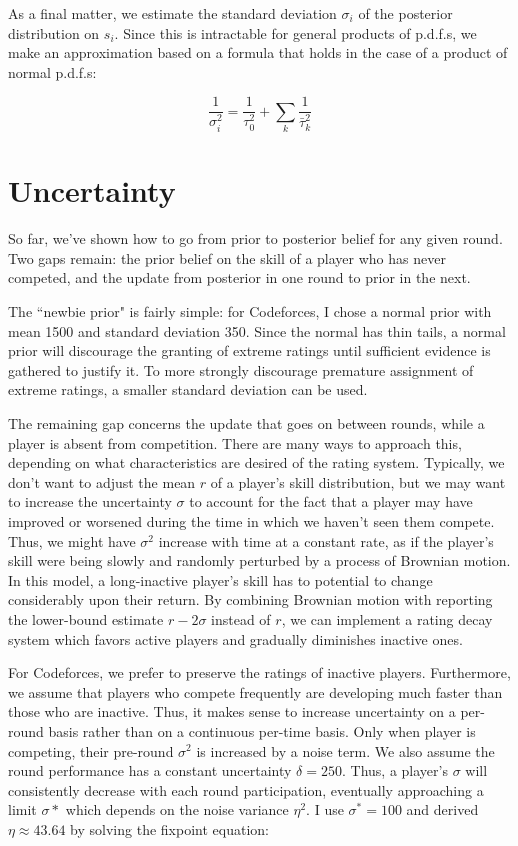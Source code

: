 \documentclass{article}
\begin{document}
As a final matter, we estimate the standard deviation $\sigma_i$ of the posterior distribution on $s_i$. Since this is intractable for general products of p.d.f.s, we make an approximation based on a formula that holds in the case of a product of normal p.d.f.s:

\[\frac{1}{\sigma_i^2} = \frac{1}{\tau_0^2} + \sum_k \frac{1}{\bar\tau_k^2}\]

\section{Uncertainty}

So far, we've shown how to go from prior to posterior belief for any given round. Two gaps remain: the prior belief on the skill of a player who has never competed, and the update from posterior in one round to prior in the next.

The ``newbie prior" is fairly simple: for Codeforces, I chose a normal prior with mean 1500 and standard deviation 350. Since the normal has thin tails, a normal prior will discourage the granting of extreme ratings until sufficient evidence is gathered to justify it. To more strongly discourage premature assignment of extreme ratings, a smaller standard deviation can be used.

The remaining gap concerns the update that goes on between rounds, while a player is absent from competition. There are many ways to approach this, depending on what characteristics are desired of the rating system. Typically, we don't want to adjust the mean $r$ of a player's skill distribution, but we may want to increase the uncertainty $\sigma$ to account for the fact that a player may have improved or worsened during the time in which we haven't seen them compete. Thus, we might have $\sigma^2$ increase with time at a constant rate, as if the player's skill were being slowly and randomly perturbed by a process of Brownian motion. In this model, a long-inactive player's skill has to potential to change considerably upon their return. By combining Brownian motion with reporting the lower-bound estimate $r-2\sigma$ instead of $r$, we can implement a rating decay system which favors active players and gradually diminishes inactive ones.

For Codeforces, we prefer to preserve the ratings of inactive players. Furthermore, we assume that players who compete frequently are developing much faster than those who are inactive. Thus, it makes sense to increase uncertainty on a per-round basis rather than on a continuous per-time basis. Only when player is competing, their pre-round $\sigma^2$ is increased by a noise term. We also assume the round performance has a constant uncertainty $\delta = 250$. Thus, a player's $\sigma$ will consistently decrease with each round participation, eventually approaching a limit $\sigma*$ which depends on the noise variance $\eta^2$. I use $\sigma^* = 100$ and derived $\eta \approx 43.64$ by solving the fixpoint equation:
\end{document}
